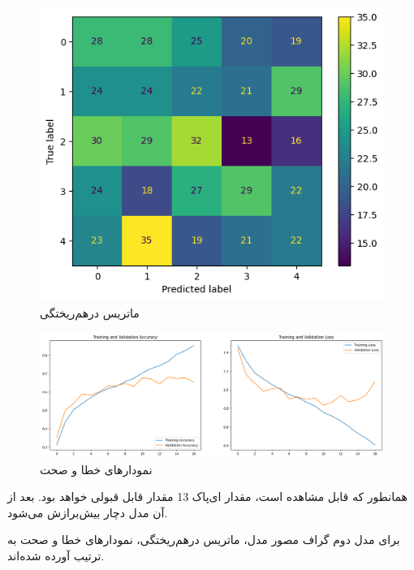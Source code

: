 \documentclass{article}
\begin{document}
\begin{figure}[!h]
    \centering\includegraphics[scale=.70]{./p1-12}
    \caption{ماتریس درهم‌ریختگی}\label{fig.112}
\end{figure}

\begin{figure}[!h]
    \centering\includegraphics[scale=.45]{./p1-13}
    \caption{نمودارهای خطا و صحت}\label{fig.113}
\end{figure}

\cleardoublepage

همانطور که قابل مشاهده است، مقدار ای‌پاک 13 مقدار قابل قبولی خواهد بود. بعد از آن مدل دچار بیش‌برازش می‌شود.

برای مدل دوم گراف مصور مدل، ماتریس درهم‌ریختگی، نمودارهای خطا و صحت به ترتیب آورده شده‌اند.
\end{document}

